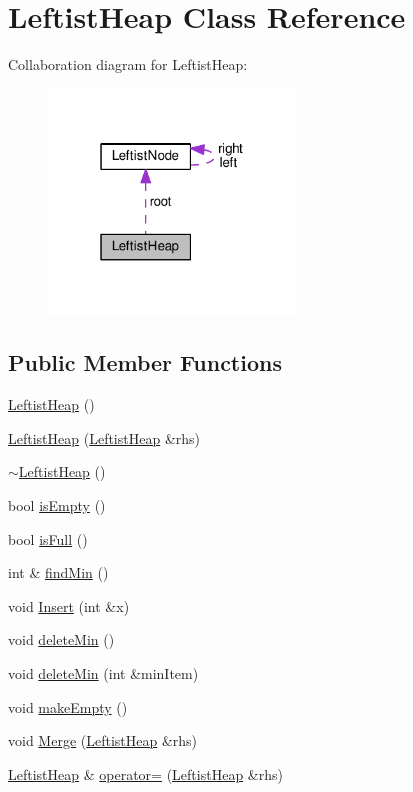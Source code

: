 \hypertarget{classLeftistHeap}{}\section{Leftist\+Heap Class Reference}
\label{classLeftistHeap}


Collaboration diagram for Leftist\+Heap\+:
\nopagebreak
\begin{figure}[H]
\begin{center}
\leavevmode
\includegraphics[width=187pt]{classLeftistHeap__coll__graph}
\end{center}
\end{figure}
\subsection*{Public Member Functions}
\begin{DoxyCompactItemize}
\item 
\hyperlink{classLeftistHeap_a07c9271159d856c743710e9eeabe10cb}{Leftist\+Heap} ()
\item 
\hyperlink{classLeftistHeap_a6ba1087bc57eaa696503673a8e0033da}{Leftist\+Heap} (\hyperlink{classLeftistHeap}{Leftist\+Heap} \&rhs)
\item 
\hyperlink{classLeftistHeap_a8476d82cfefc6b5557fa8242d34d61da}{$\sim$\+Leftist\+Heap} ()
\item 
bool \hyperlink{classLeftistHeap_a107b474e1c9f2a15710842d778305ca4}{is\+Empty} ()
\item 
bool \hyperlink{classLeftistHeap_a4ffa785d22e19ea689708ef68087724a}{is\+Full} ()
\item 
int \& \hyperlink{classLeftistHeap_aa04575171cef4ed3e1aeef7d2e7be1dd}{find\+Min} ()
\item 
void \hyperlink{classLeftistHeap_a1864cb85655de68ab0813579bd9b9659}{Insert} (int \&x)
\item 
void \hyperlink{classLeftistHeap_a41ab51a043541d4372fe10cd06561028}{delete\+Min} ()
\item 
void \hyperlink{classLeftistHeap_a6eed9075a7126edf3225498c8847aecd}{delete\+Min} (int \&min\+Item)
\item 
void \hyperlink{classLeftistHeap_a2032c8fd74f453ed323c43e016f40725}{make\+Empty} ()
\item 
void \hyperlink{classLeftistHeap_a30c5065cf2bd8c1816d944576f704cc7}{Merge} (\hyperlink{classLeftistHeap}{Leftist\+Heap} \&rhs)
\item 
\hyperlink{classLeftistHeap}{Leftist\+Heap} \& \hyperlink{classLeftistHeap_abc17697e82cfbf619ca15d0ca81cb415}{operator=} (\hyperlink{classLeftistHeap}{Leftist\+Heap} \&rhs)
\end{DoxyCompactItemize}
